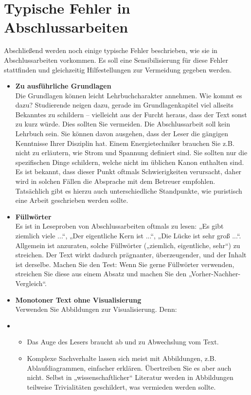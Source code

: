 \chapter{Typische Fehler in Abschlussarbeiten}
Abschließend werden noch einige typische Fehler beschrieben, wie sie in Abschlussarbeiten vorkommen. Es soll eine Sensibilisierung für diese Fehler stattfinden und gleichzeitig Hilfestellungen zur Vermeidung gegeben werden.
\begin{itemize}
    \item  \textbf{Zu ausführliche Grundlagen} \\
Die Grundlagen können leicht Lehrbuchcharakter annehmen. 
Wie kommt es dazu? Studierende neigen dazu, gerade im Grundlagenkapitel viel allseits Bekanntes zu schildern – vielleicht aus der Furcht heraus, dass der Text sonst zu kurz würde. Dies sollten Sie vermeiden. Die Abschlussarbeit soll kein Lehrbuch sein. Sie können davon ausgehen, dass der Leser die gängigen Kenntnisse Ihrer Disziplin hat. Einem Energietechniker brauchen Sie z.B. nicht zu erläutern, wie Strom und Spannung definiert sind. Sie sollten nur die spezifischen Dinge schildern, welche nicht im üblichen Kanon enthalten sind. Es ist bekannt, dass dieser Punkt oftmals Schwierigkeiten verursacht, daher wird in solchen Fällen die Absprache mit dem Betreuer empfohlen. Tatsächlich gibt es hierzu auch unterschiedliche Standpunkte, wie puristisch eine Arbeit geschrieben werden sollte. 

\item	\textbf{Füllwörter} \\
Es ist in Leseproben von Abschlussarbeiten oftmals zu lesen: „Es gibt ziemlich viele ...“, „Der eigentliche Kern ist ...“, „Die Lücke ist sehr groß ...“. Allgemein ist anzuraten, solche Füllwörter („ziemlich, eigentliche, sehr“) zu streichen. Der Text wirkt dadurch prägnanter, überzeugender, und der Inhalt ist derselbe. Machen Sie den Test: Wenn Sie gerne Füllwörter verwenden, streichen Sie diese aus einem Absatz und machen Sie den „Vorher-Nachher-Vergleich“.

\item	\textbf{Monotoner Text ohne Visualisierung}\\
Verwenden Sie Abbildungen zur Visualisierung. Denn: 
\item[]\begin{itemize}
\item Das Auge des Lesers braucht ab und zu Abwechslung vom Text. 
\item Komplexe Sachverhalte lassen sich meist mit Abbildungen, z.B. Ablaufdiagrammen, einfacher erklären. Übertreiben Sie es aber auch nicht. Selbst in „wissenschaftlicher“ Literatur werden in Abbildungen teilweise Trivialitäten geschildert, was vermieden werden sollte.
\end{itemize}


\end{itemize}
